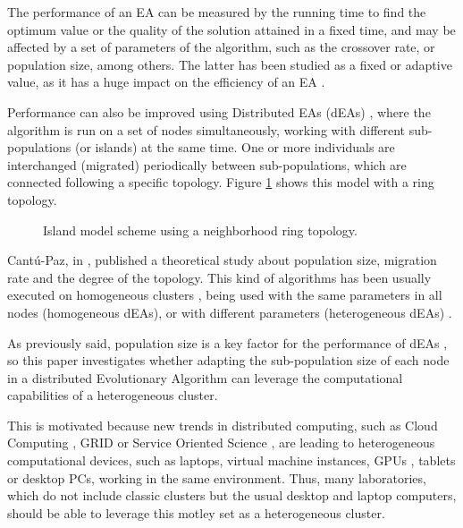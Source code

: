 \documentclass[final,1p,times]{elsarticle}
\begin{document}
The performance of an EA can be measured by the running time to find the optimum value 
or the quality of the solution attained in a fixed time, and may be affected by a set 
of parameters of the algorithm, such as the crossover rate, or population size, among others. 
The latter has been studied as a fixed \cite{SizingHarik99} or adaptive 
\cite{SelfRegulatedSizeFernandes06,AdaptiveLobo07} value, as it has a huge impact on the efficiency of an EA \cite{ShrinkageLaredo09}.

Performance can also be improved using Distributed EAs (dEAs) \cite{MULTIKULTI}, where the algorithm is run on a set of nodes simultaneously,
working with different sub-populations (or islands) at the same
time. One or more individuals are
interchanged (migrated) periodically between sub-populations, which are connected
following a specific topology. Figure \ref{fig:islands} shows this
model with a ring topology. 


\begin{figure}[htb]
\centering
{}
\caption{Island model scheme using a neighborhood ring topology.}
\label{fig:islands}
\end{figure}






Cant{\'u}-Paz, in \cite{CantuPazTopologies99}, published a theoretical study about population size, migration rate and the degree of the topology.  This kind of algorithms has been usually executed on homogeneous clusters \cite{MULTIKULTI,Wakunda97EVA}, being used with the same
parameters in all nodes (homogeneous dEAs), or with different
parameters (heterogeneous dEAs) \cite{garcia2014randomized,tanabe2013evaluation,HETEROGENEOUSPARAMETERS}. 



As previously said, population size is a key factor for the performance 
of dEAs \cite{ShrinkageLaredo09}, so this paper investigates whether
adapting the sub-population size of each node in a distributed
Evolutionary Algorithm can leverage the
computational capabilities of a heterogeneous cluster.                             

This is motivated because new trends in distributed computing, such as Cloud Computing \cite{Derby13Cloud}, GRID
\cite{OPENSCIENCEGRID} or Service Oriented Science \cite{GLOBUS}, are
leading to heterogeneous computational devices, such as laptops,
virtual machine instances, 
GPUs \cite{Acosta13GPUs},
tablets or desktop PCs, working in the same
environment. Thus, many laboratories, which do not include classic
clusters but the usual desktop and laptop computers, should be able to leverage
this motley set as a heterogeneous cluster. 
\end{document}
